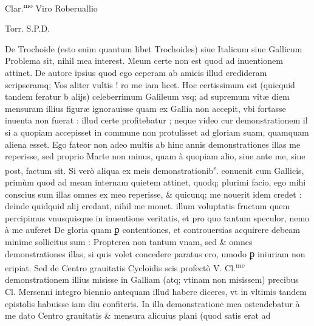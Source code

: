 \documentclass[11pt,a4paper]{article}
\begin{document}
Clar.\textsuperscript{mo} Viro Roberuallio

Torr. S.P.D.

De Trochoide (esto enim quantum libet Trochoides) siue Italicum siue Gallicum Problema sit, nihil mea interest. Meum certe non est quod ad inuentionem attinet. De autore ipsius quod ego ceperam ab amicis illud credideram scripseramq; Vos aliter vultis ! ro me iam licet. Hoc certissimum est (quicquid tandem feratur b alijs) celeberrimum Galileum vsq; ad supremum vitæ diem mensuram illius figuræ ignorauisse quam ex Gallia non accepit, vbi fortasse inuenta non fuerat : illud certe profitebatur ; neque video cur demonstrationem il\ill{} si a quopiam accepisset in commune non protulisset ad gloriam suam, quamquam aliena esset. Ego fateor non adeo multis ab hinc annis demonstrationes illas me reperisse, sed proprio Marte non minus, quam à quopiam alio, siue ante me, siue post, factum sit. Si verò aliqua ex meis demonstrationib\textsuperscript{s}. conuenit cum Gallicis, primùm quod ad meam internam quietem attinet, quodq; plurimi facio, ego mihi conscius sum illas omnes ex meo reperisse, \& quicunq; me nouerit idem credet : deinde quidquid alij credant, nihil me mouet.  illum voluptatis fructum quem percipimus vnusquisque in inuentione veritatis, et pro quo tantum speculor, nemo à me auferet De gloria quam ꝑ contentiones, et controuersias acquirere debeam minime sollicitus sum : Propterea non tantum vnam, sed \& omnes demonstrationes illas, si quis volet concedere paratus ero, umodo ꝑ iniuriam non eripiat. Sed de Centro grauitatis Cycloidis scis profectò V. Cl.\textsuperscript{me} demonstrationem illius misisse in Galliam (atq; vtinam non misissem) precibus Cl. Mersenni integro biennio antequam illud habere diceres, vt in vltimis tandem epistolis habuisse iam diu confiteris. In illa demonstratione mea ostendebatur à me dato Centro grauitatis \& mensura alicuius plani (quod satis erat ad
\end{document}

